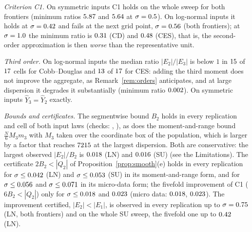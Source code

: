 \documentclass[10pt,a4paper]{article}
\theoremstyle{plain}
\theoremstyle{definition}
\theoremstyle{remark}
\newcommand{\Yh}{\widehat{Y}}
\begin{document}
\emph{Criterion C1.} On symmetric inputs C1 holds on the whole sweep for both frontiers (minimum ratios $5.87$ and $5.64$ at $\sigma=0.5$). On log-normal inputs it holds at $\sigma=0.42$ and fails at the next grid point, $\sigma=0.56$ (both frontiers); at $\sigma=1.0$ the minimum ratio is $0.31$ (CD) and $0.48$ (CES), that is, the second-order approximation is then \emph{worse} than the representative unit.

\emph{Third order.} On log-normal inputs the median ratio $|E_2|/|E_3|$ is below $1$ in $15$ of $17$ cells for Cobb--Douglas and $13$ of $17$ for CES: adding the third moment does not improve the aggregate, as Remark~\ref{rem:orders} anticipates, and at large dispersion it degrades it substantially (minimum ratio $0.002$). On symmetric inputs $\Yh_3=\Yh_2$ exactly.

\emph{Bounds and certificates.} The segmentwise bound $B_2$ holds in every replication and cell of both input laws (checks: \EoneBoundHoldsCDLN, \EoneBoundHoldsCDSU), as does the moment-and-range bound $\frac N6M_3m_3$ with $M_3$ taken over the coordinate box of the population, which is larger by a factor that reaches $7215$ at the largest dispersion. Both are conservative: the largest observed $|E_2|/B_2$ is $0.018$ (LN) and $0.016$ (SU) (see the Limitations). The certificate $2B_2<|Q_2|$ of Proposition~\ref{prop:smooth}(e) holds in every replication for $\sigma\le0.042$ (LN) and $\sigma\le0.053$ (SU) in its moment-and-range form, and for $\sigma\le0.056$ and $\sigma\le0.071$ in its micro-data form; the fivefold improvement of C1 ($6B_2<|Q_2|$) only for $\sigma\le0.018$ and $0.023$ (micro data: $0.018$, $0.023$). The improvement certified, $|E_2|<|E_1|$, is observed in every replication up to $\sigma=0.75$ (LN, both frontiers) and on the whole SU sweep, the fivefold one up to $0.42$ (LN).
\end{document}
